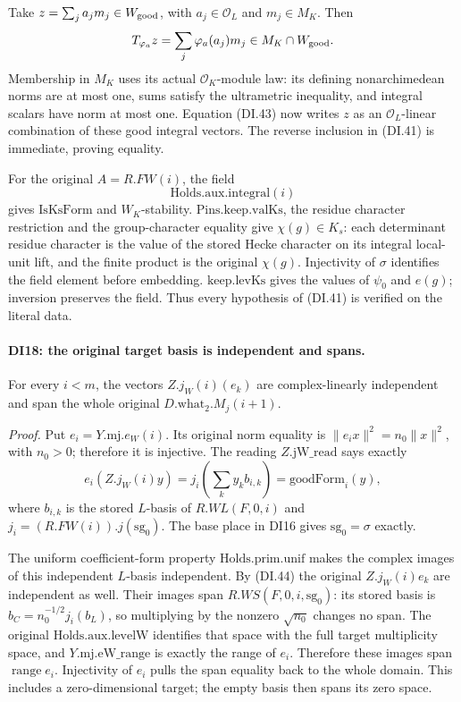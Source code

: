 Take \(z=\sum_j a_jm_j\in W_{\rm good}\), with
\(a_j\in\mathcal O_L\) and \(m_j\in M_K\). Then
\[
 T_{\varphi_a}z=\sum_j\varphi_a(a_j)m_j
                                \in M_K\cap W_{\rm good}.
\]
Membership in \(M_K\) uses its actual \(\mathcal O_K\)-module
law: its defining nonarchimedean norms are at most one, sums satisfy
the ultrametric inequality, and integral scalars have norm at most
one. Equation (DI.43) now writes \(z\) as an
\(\mathcal O_L\)-linear combination of these good integral vectors.
The reverse inclusion in (DI.41) is immediate, proving equality.

For the original \(A=R.FW(i)\), the field
\[
               \mathrm{Holds}.\mathrm{aux}.\mathrm{integral}(i)
\]
gives
\(\mathrm{IsKsForm}\) and \(W_K\)-stability.
\(\mathrm{Pins}.\mathrm{keep}.\mathrm{valKs}\), the residue
character restriction and the group-character equality give
\(\chi(g)\in K_s\): each determinant residue character is the
value of the stored Hecke character on its integral local-unit lift,
and the finite product is the original \(\chi(g)\). Injectivity
of \(\sigma\) identifies the field element before embedding.
\(\mathrm{keep}.\mathrm{levKs}\) gives the values of \(\psi_0\)
and \(e(g)\); inversion preserves the field. Thus every hypothesis
of (DI.41) is verified on the literal data.

\paragraph{DI18: the original target basis is independent and spans.}
\label{claim:DI18}
For every \(i<m\), the vectors
\(Z.j_W(i)(e_k)\) are complex-linearly independent and span the
whole original \(D.\mathrm{what}_2.M_j(i+1)\).

\emph{Proof.}
Put \(e_i=Y.\mathrm{mj}.e_W(i)\). Its original norm equality is
\(\|e_i x\|^2=n_0\|x\|^2\), with \(n_0>0\); therefore it is
injective. The reading \(Z.\mathrm{jW\_read}\) says exactly
\[
 e_i(Z.j_W(i)y)
   =j_i\left(\sum_k y_k b_{i,k}\right)
   =\mathrm{goodForm}_i(y),
 \tag{DI.44}
\]
where \(b_{i,k}\) is the stored \(L\)-basis of
\(R.WL(F,0,i)\) and \(j_i=(R.FW(i)).j(\mathrm{sg}_0)\).
The base place in DI16 gives \(\mathrm{sg}_0=\sigma\) exactly.

The uniform coefficient-form property
\(\mathrm{Holds}.\mathrm{prim}.\mathrm{unif}\) makes the complex
images of this independent \(L\)-basis independent. By (DI.44)
the original \(Z.j_W(i)e_k\) are independent as well. Their images
span \(R.WS(F,0,i,\mathrm{sg}_0)\): its stored basis is
\(b_C=n_0^{-1/2}j_i(b_L)\), so multiplying by the nonzero
\(\sqrt{n_0}\) changes no span. The original
\(\mathrm{Holds}.\mathrm{aux}.\mathrm{levelW}\) identifies that
space with the full target multiplicity space, and
\(Y.\mathrm{mj}.\mathrm{eW\_range}\) is exactly the range of
\(e_i\). Therefore these images span \(\operatorname{range}e_i\).
Injectivity of \(e_i\) pulls the span equality back to the whole
domain. This includes a zero-dimensional target; the empty basis
then spans its zero space.

